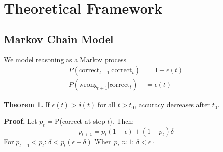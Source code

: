 \section{Theoretical Framework}

\subsection{Markov Chain Model}

We model reasoning as a Markov process:
\begin{align}
P(\text{correct}_{t+1} | \text{correct}_t) &= 1 - \epsilon(t) \\
P(\text{wrong}_{t+1} | \text{correct}_t) &= \epsilon(t)
\end{align}

\textbf{Theorem 1.} If $\epsilon(t) > \delta(t)$ for all $t > t_0$, accuracy decreases after $t_0$.

\textbf{Proof.} Let $p_t$ = P(correct at step $t$). Then:
$$p_{t+1} = p_t(1-\epsilon) + (1-p_t)\delta$$
For $p_{t+1} < p_t$: $\delta < p_t(\epsilon + \delta)$
When $p_t \approx 1$: $\delta < \epsilon$ $\square$
